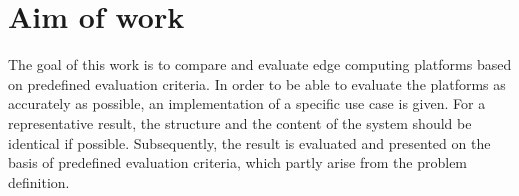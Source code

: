 \chapter{Aim of work}
The goal of this work is to compare and evaluate edge computing platforms based on predefined evaluation criteria. In order to be able to evaluate the platforms as accurately as possible, an implementation of a specific use case is given. For a representative result, the structure and the content of the system should be identical if possible. Subsequently, the result is evaluated and presented on the basis of predefined evaluation criteria, which partly arise from the problem definition.
